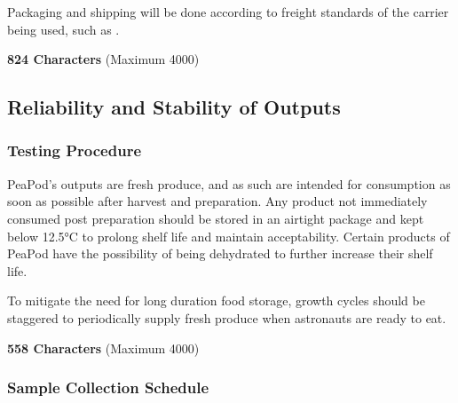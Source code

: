 Packaging and shipping will be done according to freight standards of the carrier being used, such as \cite{shipping}. 


\textbf{824 Characters} (Maximum 4000)

\clearpage

\subsection{Reliability and Stability of Outputs}


\subsubsection{Testing Procedure}

PeaPod's outputs are fresh produce, and as such are intended for consumption as soon as possible after harvest and preparation. Any product not immediately consumed post preparation should be stored in an airtight package and kept below 12.5°C to prolong shelf life and maintain acceptability. Certain products of PeaPod have the possibility of being dehydrated to further increase their shelf life.

To mitigate the need for long duration food storage, growth cycles should be staggered to periodically supply fresh produce when astronauts are ready to eat.

\textbf{558 Characters} (Maximum 4000)

\subsubsection{Sample Collection Schedule}

